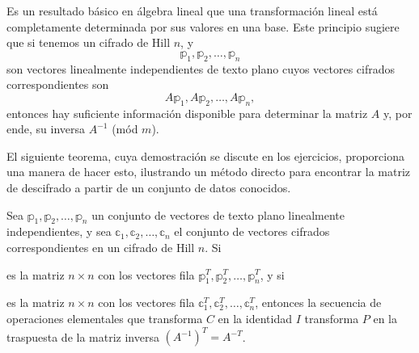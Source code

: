 Es un resultado básico en álgebra lineal que una transformación lineal está completamente determinada por sus valores en una base. Este principio sugiere que si tenemos un cifrado de Hill $n$, y
$$\mathbb{p}_1, \mathbb{p}_2, \dots, \mathbb{p}_n$$
son vectores linealmente independientes de texto plano cuyos vectores cifrados correspondientes son
$$A \mathbb{p}_1, A \mathbb{p}_2, \dots, A \mathbb{p}_n,$$
entonces hay suficiente información disponible para determinar la matriz $A$ y, por ende, su inversa $A^{-1}$ (mód $m$).

El siguiente teorema, cuya demostración se discute en los ejercicios, proporciona una manera de hacer esto, ilustrando un método directo para encontrar la matriz de descifrado a partir de un conjunto de datos conocidos.

\newpage

\begin{theorem}{}{}
    Sea $\mathbb{p}_1, \mathbb{p}_2, \dots, \mathbb{p}_n$ un conjunto de vectores de texto plano linealmente independientes, y sea $\mathbb{c}_1, \mathbb{c}_2, \dots, \mathbb{c}_n$ el conjunto de vectores cifrados correspondientes en un cifrado de Hill $n$. Si
    \begin{matrizn}
    \end{matrizn}
    es la matriz $n \times n$ con los vectores fila $\mathbb{p}_1^T, \mathbb{p}_2^T, \dots, \mathbb{p}_n^T$, y si
    \begin{matrizn}
    \end{matrizn}
    es la matriz $n \times n$ con los vectores fila $\mathbb{c}_1^T, \mathbb{c}_2^T, \dots, \mathbb{c}_n^T$, entonces la secuencia de operaciones elementales que transforma $C$ en la identidad $I$ transforma $P$ en la traspuesta de la matriz inversa $\left(A^{-1}\right)^T = A^{-T}$.
\end{theorem}

